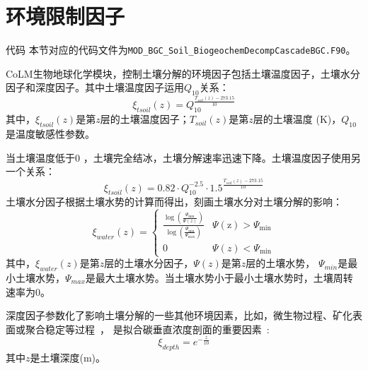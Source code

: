 \section{环境限制因子}\label{环境限制因子}

\begin{mymdframed}{代码}
本节对应的代码文件为\texttt{MOD\_BGC\_Soil\_BiogeochemDecompCascadeBGC.F90}。
\end{mymdframed}

CoLM生物地球化学模块，控制土壤分解的环境因子包括土壤温度因子，土壤水分因子和深度因子。其中土壤温度因子运用$Q_{10}$关系：
\begin{equation}
\xi_{t s o i l}(z)=Q_{10}^{\frac{T_{{soil }}(z)-273.15}{10}}
\end{equation}
其中，$\xi_{tsoil}\left(z\right)$是第$z$层的土壤温度因子；$T_{soil}\left(z\right)$是第$z$层的土壤温度 (K)，$Q_{10}$是温度敏感性参数。


当土壤温度低于0 \textcelsius，土壤完全结冰，土壤分解速率迅速下降。土壤温度因子使用另一个关系：
\begin{equation}
\xi_{t s o i l}(z)=0.82 \cdot Q_{10}^{-2.5} \cdot 1.5^{\frac{T_{{soil }}(z)-273.15}{10}}
\end{equation}
土壤水分因子根据土壤水势的计算而得出，刻画土壤水分对土壤分解的影响：
\begin{equation}
\xi_{w a t e r}(z)=\begin{cases}
\frac{\log \left(\frac{\Psi_{\min }}{\Psi(z)}\right)}{\log \left(\frac{\Psi_{\min }}{\Psi_{\max }}\right)} 
    & \Psi(\mathrm{z})>\Psi_{\min } \\
0  & \Psi(z)<\Psi_{\min }
\end{cases}
\end{equation}
其中，$\xi_{water}\left(z\right)$是第$z$层的土壤水分因子，$\Psi\left(z\right)$是第$z$层的土壤水势，
$\Psi_{min}$是最小土壤水势，$\Psi_{max}$是最大土壤水势。当土壤水势小于最小土壤水势时，土壤周转速率为0。


深度因子参数化了影响土壤分解的一些其他环境因素，比如，微生物过程、矿化表面或聚合稳定等过程~\citep{koven2013effect}，
是拟合碳垂直浓度剖面的重要因素~\citep{jenkinson2008turnover}:
\begin{equation}
\xi_{d e p t h}=e^{-\frac{z}{10}}
\end{equation}
其中$z$是土壤深度(m)。


